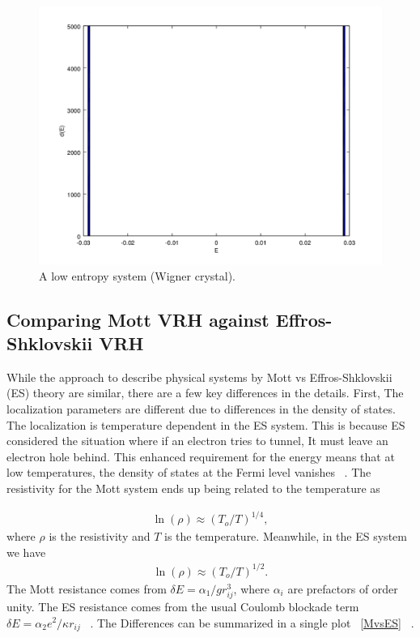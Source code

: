 \begin{figure}[htbp]
\begin{center}
\includegraphics[scale=.50]{splitDos.png}
\caption{A low entropy system (Wigner crystal).}
\label{crystalDoS}
\end{center}
\end{figure}

\subsection{Comparing Mott VRH against Effros-Shklovskii VRH}
While the approach to describe physical systems by Mott vs Effros-Shklovskii (ES) theory are similar, there are a few key differences in the details. First, The localization parameters are different due to differences in the density of states. The localization is temperature dependent in the ES system. This is because ES considered the situation where if an electron tries to tunnel, It must leave an electron hole behind. This enhanced requirement for the energy means that at low temperatures, the density of states at the Fermi level vanishes ~\cite{joung}. The resistivity for the Mott system ends up being related to the temperature as

\begin{eqnarray}
\ln(\rho) \approx (T_o / T)^{1/4} ,
\label{fourth}
\end{eqnarray}
where $\rho$ is the resistivity and $T$ is the temperature. Meanwhile, in the ES system we have
\begin{eqnarray}
\ln(\rho) \approx (T_o / T)^{1/2}.
\label{half}
\end{eqnarray}
The Mott resistance comes from $\delta E = \alpha_1 / g r_{ij}^3 $, where $\alpha_i$ are prefactors of order unity. The ES resistance comes from the usual Coulomb blockade term $\delta E = \alpha_2 e^2 / \kappa r_{ij}$ ~\cite{aharony92}. The Differences can be summarized in a single plot ~\ref{MvsES} ~\cite{Liu10}.

